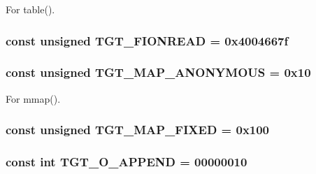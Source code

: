 For table(). \hypertarget{classAlphaTru64_a1def346ff527c8efccfd52463f3b5dc1}{
\subsubsection[{TGT\_\-FIONREAD}]{\setlength{\rightskip}{0pt plus 5cm}const unsigned {\bf TGT\_\-FIONREAD} = 0x4004667f}}
\label{classAlphaTru64_a1def346ff527c8efccfd52463f3b5dc1}
\hypertarget{classAlphaTru64_a0bbc267200567dd98250b99b6085a499}{
\subsubsection[{TGT\_\-MAP\_\-ANONYMOUS}]{\setlength{\rightskip}{0pt plus 5cm}const unsigned {\bf TGT\_\-MAP\_\-ANONYMOUS} = 0x10}}
\label{classAlphaTru64_a0bbc267200567dd98250b99b6085a499}


For mmap(). \hypertarget{classAlphaTru64_a0124e421d7846143bca15728b7a53e14}{
\subsubsection[{TGT\_\-MAP\_\-FIXED}]{\setlength{\rightskip}{0pt plus 5cm}const unsigned {\bf TGT\_\-MAP\_\-FIXED} = 0x100}}
\label{classAlphaTru64_a0124e421d7846143bca15728b7a53e14}
\hypertarget{classAlphaTru64_af11adc5404ea3780a5ce2829cc3710b7}{
\subsubsection[{TGT\_\-O\_\-APPEND}]{\setlength{\rightskip}{0pt plus 5cm}const int {\bf TGT\_\-O\_\-APPEND} = 00000010}}
\label{classAlphaTru64_af11adc5404ea3780a5ce2829cc3710b7}


